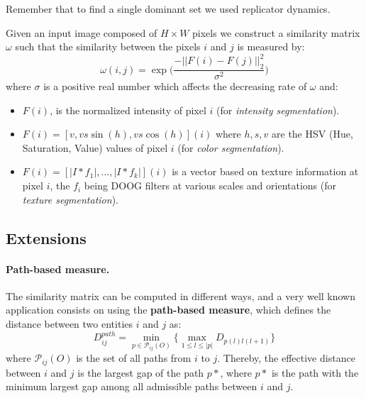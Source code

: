 Remember that to find a single dominant set we used replicator dynamics.

Given an input image composed of $H \times W$ pixels we construct a similarity matrix $\omega$ such that the similarity between the pixels $i$ and $j$ is measured by:
$$\omega(i,j) = \exp\Big(\frac{-||F(i)- F(j)||^2_2}{\sigma^2}\Big)$$
where $\sigma$ is a positive real number which affects the decreasing rate of $\omega$ and:
\begin{itemize}
	\item $F(i)$, is the normalized intensity of pixel $i$ (for \textit{intensity segmentation}).
	\item $F(i) = [v, vs\sin(h), vs\cos(h)](i)$ where $h,s,v$ are the HSV (Hue, Saturation, Value) values of pixel $i$ (for \textit{color segmentation}).
	\item $F(i) = [|I*f_1|, \dots, |I*f_k|](i)$ is a vector based on texture information at pixel $i$, the $f_i$ being DOOG filters at various scales and orientations (for \textit{texture segmentation}).
\end{itemize}

\subsection{Extensions}
\paragraph{Path-based measure.} The similarity matrix can be computed in different ways, and a very well known application consists on using the \textbf{path-based measure}, which defines the distance between two entities $i$ and $j$ as:
$$D_{ij}^{path} = \min\limits_{p\in\mathcal{P}_{ij}(O)}\Big\{\max\limits_{1\leq l \leq |p|}D_{p(l)l(l+1)}\Big\}$$
where $\mathcal{P}_{ij}(O)$ is the set of all paths from $i$ to $j$. Thereby, the effective distance between $i$ and $j$ is the largest gap of the path $p*$, where $p*$ is the path with the minimum largest gap among all admissible paths between $i$ and $j$.

